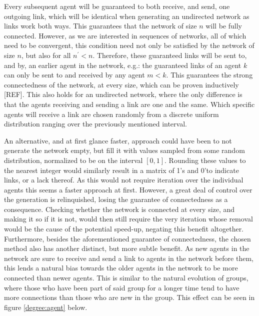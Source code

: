 \documentclass{article}
\begin{document}
Every subsequent agent will be guaranteed to both receive, and send, one outgoing link, which will be identical when generating an undirected network as links work both ways. This guarantees that the network of size $n$ will be fully connected. However, as we are interested in sequences of networks, all of which need to be convergent, this condition need not only be satisfied by the network of size $n$, but also for all $n^{\prime} < n$. Therefore, these guaranteed links will be sent to, and by, an earlier agent in the network, e.g.: the guaranteed links of an agent $k$ can only be sent to and received by any agent $m < k$. This guarantees the strong connectedness of the network, at every size, which can be proven inductively [REF]. This also holds for an undirected network, where the only difference is that the agents receiving and sending a link are one and the same. Which specific agents will receive a link are chosen randomly from a discrete uniform distribution ranging over the previously mentioned interval. \newpage 

An alternative, and at first glance faster, approach could have been to not generate the network empty, but fill it with values sampled from some random distribution, normalized to be on the interval $[0, 1]$. Rounding these values to the nearest integer would similarly result in a matrix of 1's and 0'to indicate links, or a lack thereof. As this would not require iteration over the individual agents this seems a faster approach at first. However, a great deal of control over the generation is relinquished, losing the guarantee of connectedness as a consequence. Checking whether the network is connected at every size, and making it so if it is not, would then still require the very iteration whose removal would be the cause of the potential speed-up, negating this benefit altogether. Furthermore, besides the aforementioned guarantee of connectedness, the chosen method also has another distinct, but more subtle benefit. As new agents in the network are sure to receive and send a link to agents in the network before them, this lends a natural bias towards the older agents in the network to be more connected than newer agents. This is similar to the natural evolution of groups, where those who have been part of said group for a longer time tend to have more connections than those who are new in the group. This effect can be seen in figure \ref{degree:agent} below.
\end{document}
